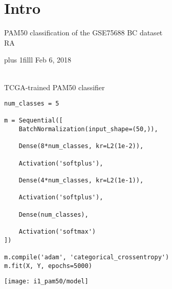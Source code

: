 \documentclass[onepage]{beamer}
\author{\small RA}
\makeatletter
\newcommand{\EMAIL}{{\color{blue}randreev{\tiny\color{white}.\hspace{-1.5pt}}@{\tiny\color{white}.\hspace{-1.5pt}}stat.sinica.edu.tw}}
\def\Bottom#1{\vskip 0pt plus 1filll #1}
\makeatother
\begin{document}

\section{Intro}



\begin{frame}[plain,t]
	\begin{center}
		PAM50 classification of the GSE75688 BC dataset
		\\[1\baselineskip]
		\small
		RA

		\vspace{1cm}


	\end{center}

	\Bottom{
		\scriptsize
		\hfill
		Feb 6, 2018
		\\ {\ }
	}
\end{frame}


\begin{frame}[t,fragile]{TCGA-trained PAM50 classifier}{}
\begin{minipage}{0.7\textwidth}
\begin{lstlisting}
num_classes = 5

m = Sequential([
	BatchNormalization(input_shape=(50,)),
	
	Dense(8*num_classes, kr=L2(1e-2)),
	
	Activation('softplus'),
	
	Dense(4*num_classes, kr=L2(1e-1)),
	
	Activation('softplus'),
	
	Dense(num_classes),
	
	Activation('softmax')
])

m.compile('adam', 'categorical_crossentropy')
m.fit(X, Y, epochs=5000)
\end{lstlisting}
\end{minipage}
\begin{minipage}{0.29\textwidth}
\texttt{[image: i1\_pam50/model]}
\end{minipage}
\end{frame}
\end{document}
